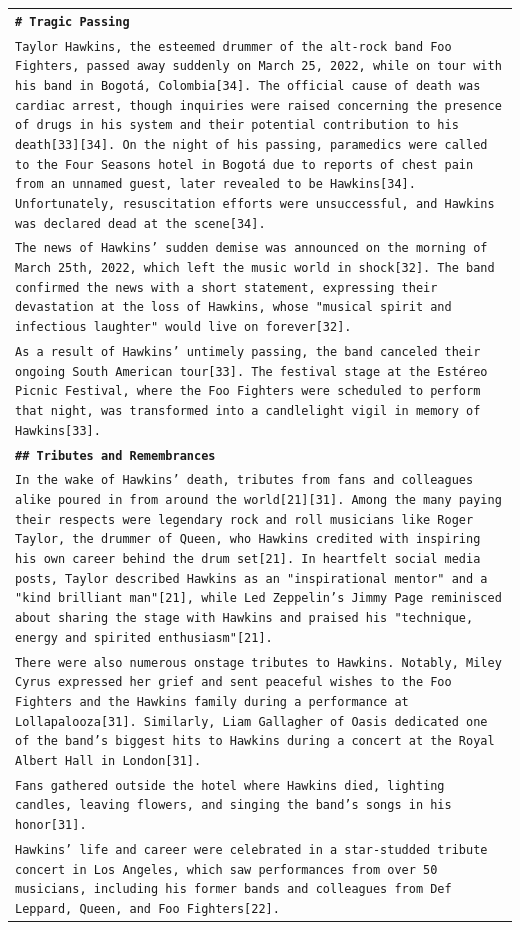 \documentclass[11pt]{article}
\begin{document}
\begin{longtable}{p{\textwidth}}
\vspace{1pt}
\texttt{\small{\textbf{\# Tragic Passing}}} \\
\texttt{\small{Taylor Hawkins, the esteemed drummer of the alt-rock band Foo Fighters, passed away suddenly on March 25, 2022, while on tour with his band in Bogotá, Colombia[34]. The official cause of death was cardiac arrest, though inquiries were raised concerning the presence of drugs in his system and their potential contribution to his death[33][34]. On the night of his passing, paramedics were called to the Four Seasons hotel in Bogotá due to reports of chest pain from an unnamed guest, later revealed to be Hawkins[34]. Unfortunately, resuscitation efforts were unsuccessful, and Hawkins was declared dead at the scene[34].}} \\
\texttt{\small{The news of Hawkins' sudden demise was announced on the morning of March 25th, 2022, which left the music world in shock[32]. The band confirmed the news with a short statement, expressing their devastation at the loss of Hawkins, whose "musical spirit and infectious laughter" would live on forever[32].}} \\
\texttt{\small{As a result of Hawkins' untimely passing, the band canceled their ongoing South American tour[33]. The festival stage at the Estéreo Picnic Festival, where the Foo Fighters were scheduled to perform that night, was transformed into a candlelight vigil in memory of Hawkins[33].}} \\
\vspace{1pt}
\texttt{\small{\textbf{\#\# Tributes and Remembrances}}} \\
\texttt{\small{In the wake of Hawkins' death, tributes from fans and colleagues alike poured in from around the world[21][31]. Among the many paying their respects were legendary rock and roll musicians like Roger Taylor, the drummer of Queen, who Hawkins credited with inspiring his own career behind the drum set[21]. In heartfelt social media posts, Taylor described Hawkins as an "inspirational mentor" and a "kind brilliant man"[21], while Led Zeppelin's Jimmy Page reminisced about sharing the stage with Hawkins and praised his "technique, energy and spirited enthusiasm"[21].}} \\
\texttt{\small{There were also numerous onstage tributes to Hawkins. Notably, Miley Cyrus expressed her grief and sent peaceful wishes to the Foo Fighters and the Hawkins family during a performance at Lollapalooza[31]. Similarly, Liam Gallagher of Oasis dedicated one of the band's biggest hits to Hawkins during a concert at the Royal Albert Hall in London[31].}} \\
\texttt{\small{Fans gathered outside the hotel where Hawkins died, lighting candles, leaving flowers, and singing the band's songs in his honor[31].}} \\
\texttt{\small{Hawkins' life and career were celebrated in a star-studded tribute concert in Los Angeles, which saw performances from over 50 musicians, including his former bands and colleagues from Def Leppard, Queen, and Foo Fighters[22].}} \\



\end{longtable}
\end{document}
